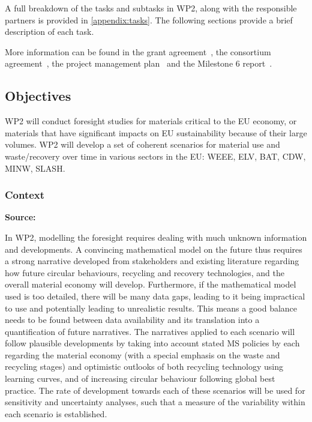 

A full breakdown of the tasks and subtasks in WP2, along with the responsible partners is provided in \autoref{appendix:tasks}. The following sections provide a brief description of each task.

More information can be found in the grant agreement~\cite{futuram2022ga}, the consortium agreement~\cite{futuram2022ca}, the project management plan~\cite{futuram2022pmp} and the Milestone 6 report~\cite{futuram2023m6}.


\subsection{Objectives}
WP2 will conduct foresight studies for materials critical to the EU economy, or materials that have significant impacts on EU sustainability because of their large volumes. WP2 will develop a set of coherent scenarios for material use and waste/recovery over time in various sectors in the EU: WEEE, ELV, BAT, CDW, MINW, SLASH.

\subsubsection{Context}

\textbf{Source:}~\cite{futuram2022ga}


In WP2, modelling the foresight requires dealing with much unknown information and developments. A convincing
mathematical model on the future thus requires a strong narrative developed from stakeholders and existing literature
regarding how future circular behaviours, recycling and recovery technologies, and the overall material economy
will develop. Furthermore, if the mathematical model used is too detailed, there will be many data gaps, leading to it
being impractical to use and potentially leading to unrealistic results. This means a good balance needs to be found
between data availability and its translation into a quantification of future narratives. The narratives applied to each
scenario will follow plausible developments by taking into account stated MS policies by each regarding the material
economy (with a special emphasis on the waste and recycling stages) and optimistic outlooks of both recycling
technology using learning curves, and of increasing circular behaviour following global best practice. The rate of
development towards each of these scenarios will be used for sensitivity and uncertainty analyses, such that a measure
of the variability within each scenario is established.


